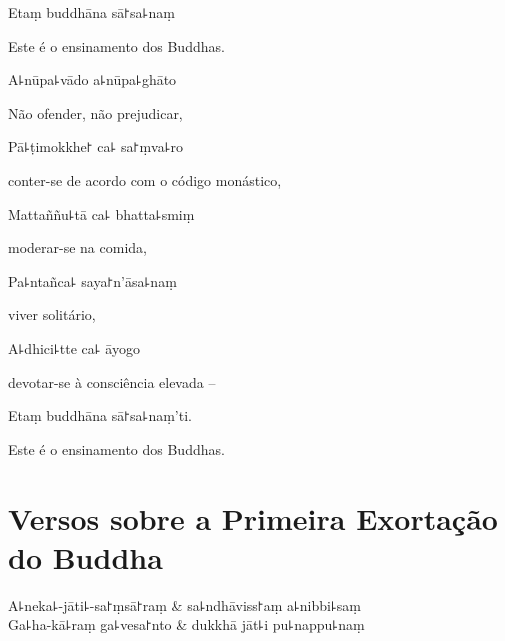 Etaṃ buddhāna sā꜓sa꜕naṃ

\begin{english}
  Este é o ensinamento dos Buddhas.
\end{english}

A꜕nūpa꜕vādo a꜕nūpa꜕ghāto

\begin{english}
  Não ofender, não prejudicar,
\end{english}

Pā꜕ṭimokkhe꜓ ca꜕ sa꜓ṃva꜕ro

\begin{english}
  conter-se de acordo com o código monástico,
\end{english}

Mattaññu꜕tā ca꜕ bhatta꜕smiṃ

\begin{english}
  moderar-se na comida,
\end{english}

Pa꜕ntañca꜕ saya꜓n'āsa꜕naṃ

\begin{english}
  viver solitário,
\end{english}

A꜕dhici꜕tte ca꜕ āyogo

\begin{english}
  devotar-se à consciência elevada --
\end{english}

Etaṃ buddhāna sā꜓sa꜕naṃ'ti.

\begin{english}
  Este é o ensinamento dos Buddhas.
\end{english}

\chapter[A Primeira Exortação]{Versos sobre a Primeira Exortação do Buddha}


\begin{leader}
\end{leader}

\begin{twochants}
  A꜕neka꜕-jāti꜕-sa꜓ṃsā꜓raṃ & sa꜕ndhāviss꜓aṃ a꜕nibbi꜕saṃ \\
  Ga꜕ha-kā꜕raṃ ga꜕vesa꜓nto & dukkhā jāt꜕i pu꜕nappu꜕naṃ \\
\end{twochants}

